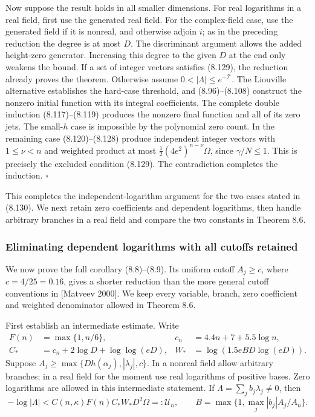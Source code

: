 \documentclass[
  11pt,
  a4paper,
]{article}
\begin{document}
Now suppose the result holds in all smaller dimensions. For real
logarithms in a real field, first use the generated real field. For the
complex-field case, use the generated field if it is nonreal, and
otherwise adjoin \(i\); as in the preceding reduction the degree is at
most \(D\). The discriminant argument allows the added height-zero
generator. Increasing this degree to the given \(D\) at the end only
weakens the bound. If a set of integer vectors satisfies (8.129), the
reduction already proves the theorem. Otherwise assume
\(0<|\Lambda|\le e^{-\mathcal T}\). The Liouville alternative
establishes the hard-case threshold, and (8.96)--(8.108) construct the
nonzero initial function with its integral coefficients. The complete
double induction (8.117)--(8.119) produces the nonzero final function
and all of its zero jets. The small-\(h\) case is impossible by the
polynomial zero count. In the remaining case (8.120)--(8.128) produce
independent integer vectors with \(1\le\nu<n\) and weighted product at
most \(\tfrac12(4e^2)^{n-\nu}\Omega\), since \(\gamma/N\le1\). This is
precisely the excluded condition (8.129). The contradiction completes
the induction. \(\square\)

This completes the independent-logarithm argument for the two cases
stated in (8.130). We next retain zero coefficients and dependent
logarithms, then handle arbitrary branches in a real field and compare
the two constants in Theorem 8.6.

\subsubsection{Eliminating dependent logarithms with all cutoffs
retained}\label{eliminating-dependent-logarithms-with-all-cutoffs-retained}

We now prove the full corollary (8.8)--(8.9). Its uniform cutoff
\(A_j\ge c\), where \(c=4/25=0.16\), gives a shorter reduction than the
more general cutoff conventions in {[}Matveev 2000{]}. We keep every
variable, branch, zero coefficient and weighted denominator allowed in
Theorem 8.6.

First establish an intermediate estimate. Write \[
\begin{aligned}
F(n)&=\max\{1,n/6\},&
c_n&=4.4n+7+5.5\log n,\\
C_*&=c_n+2\log D+\log\log(eD),&
W_*&=\log(1.5eBD\log(eD)).
\end{aligned}
\] Suppose \(A_j\ge\max\{Dh(\alpha_j),|\lambda_j|,c\}\). In a nonreal
field allow arbitrary branches; in a real field for the moment use real
logarithms of positive bases. Zero logarithms are allowed in this
intermediate statement. If \(\Lambda=\sum_jb_j\lambda_j\ne0\), then \[
-\log|\Lambda|<
C(n,\kappa)F(n)C_*W_*D^2\Omega
=:\mathcal U_n,\qquad
B=\max\{1,\max_j|b_j|A_j/A_n\}.
\tag{8.131}
\]
\end{document}
